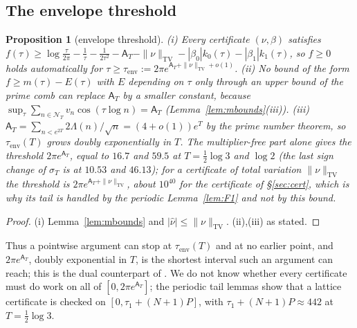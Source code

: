 \documentclass[11pt]{amsart}
\newtheorem{proposition}[theorem]{Proposition}
\theoremstyle{definition}
\theoremstyle{remark}
\newcommand{\TV}{\operatorname{TV}}
\newcommand{\sT}{\sigma_T}
\newcommand{\nuh}{\widehat\nu}
\newcommand{\NT}{\mathcal N_T}
\newcommand{\Aconst}{\mathsf A_T}
\begin{document}
\subsection{The envelope threshold}

\begin{proposition}[envelope threshold]\label{prop:env}
\emph{(i)} Every certificate $(\nu,\beta)$ satisfies $f(\tau)\ge\log\frac\tau{2\pi}-\frac1\tau-\frac1{2\tau^2}-\Aconst-\|\nu\|_{\TV}-|\beta_0|k_0(\tau)-|\beta_1|k_1(\tau)$,
so $f\ge0$ holds automatically for $\tau\ge\tau_{\mathrm{env}}:=2\pi e^{\Aconst+\|\nu\|_{\TV}+o(1)}$.
\emph{(ii)} No bound of the form $f\ge m(\tau)-E(\tau)$ with $E$ depending on $\tau$ only through
an upper bound of the prime comb can replace $\Aconst$ by a smaller constant, because
$\sup_\tau\sum_{n\in\NT}v_n\cos(\tau\log n)=\Aconst$ (Lemma~\ref{lem:mbounds}(iii)).
\emph{(iii)} $\Aconst=\sum_{n<e^{2T}}2\Lambda(n)/\sqrt n=(4+o(1))e^{T}$ by the prime number theorem,
so $\tau_{\mathrm{env}}(T)$ grows doubly exponentially in $T$. The multiplier-free part alone gives
the threshold $2\pi e^{\Aconst}$, equal to $16.7$ and $59.5$ at $T=\frac12\log3$ and $\log2$ (the last
sign change of $\sT$ is at $10.53$ and $46.13$); for a certificate of total variation $\|\nu\|_{\TV}$
the threshold is $2\pi e^{\Aconst+\|\nu\|_{\TV}}$, about $10^{40}$ for the certificate of
\S\ref{sec:cert}, which is why its tail is handled by the periodic Lemma~\ref{lem:F1} and not by this
bound.
\end{proposition}
\begin{proof}
(i) Lemma~\ref{lem:mbounds} and $|\nuh|\le\|\nu\|_{\TV}$. (ii),(iii) as stated.
\end{proof}

Thus a pointwise argument can stop at $\tau_{\mathrm{env}}(T)$ and at no earlier point, and
$2\pi e^{\Aconst}$, doubly exponential in $T$, is the shortest interval such an argument can
reach; this is the dual counterpart of \cite[Thm.~1.4]{Zhu2026}. We do not know whether every
certificate must do work on all of $[0,2\pi e^{\Aconst}]$; the periodic tail lemmas show that a
lattice certificate is checked on $[0,\tau_1+(N+1)P]$, with $\tau_1+(N+1)P\approx442$ at $T=\frac12\log3$.
\end{document}
